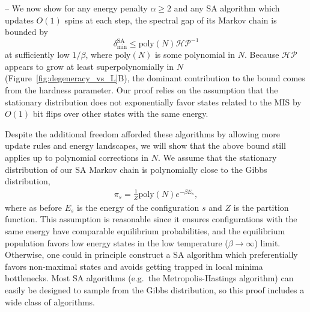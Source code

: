 \documentclass[twocolumn,amssymb,secnumarabic, prl, aps, nofootinbib]{revtex4-1}
\begin{document}
-- 
We now show for any energy penalty $\alpha \geq 2$ and any SA algorithm which updates $O(1)$ spins at each step, the spectral gap of its Markov chain is bounded by
\begin{equation}
	\boxed{\delta_{\min}^{\text{SA}}\leq \text{poly}(N)\mathcal{HP}^{-1}}\label{eq:general_bound}
\end{equation}
at sufficiently low $1/\beta$, where $\text{poly}(N)$ is some polynomial in $N$. Because $\mathcal{HP}$ appears to grow at least superpolynomially in $N$ (Figure~\ref{fig:degeneracy_vs_L}B), the dominant contribution to the bound comes from the hardness parameter. Our proof relies on the assumption that the stationary distribution does not exponentially favor states related to the MIS by $O(1)$ bit flips over other states with the same energy. 

Despite the additional freedom afforded these algorithms by allowing more update rules and energy landscapes, we will show that the above bound still applies up to polynomial corrections in $N$.
We assume that the stationary distribution of our SA Markov chain is polynomially close to the Gibbs distribution,
\begin{align}
	\pi_s =\frac{1}{Z}\text{poly}(N) e^{- \beta E_s},
\end{align}
where as before $E_s$ is the energy of the configuration $s$ and $Z$ is the partition function. This assumption is reasonable since it ensures configurations with the same energy have comparable equilibrium probabilities, and the equilibrium population favors low energy states in the low temperature ($\beta\to \infty$) limit. Otherwise, one could in principle construct a SA algorithm which preferentially favors non-maximal states and avoids getting trapped in local minima bottlenecks. Most SA algorithms (e.g.\ the Metropolis-Hastings algorithm) can easily be designed to sample from the Gibbs distribution, so this proof includes a wide class of algorithms.
\end{document}
